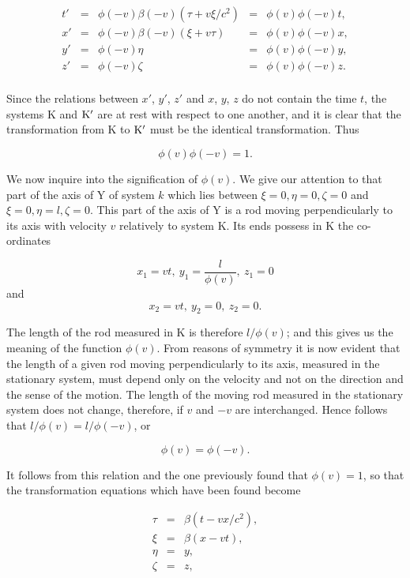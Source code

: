\documentclass{article}
\newcommand{\pr}[1]{${\rm #1}'$}
\begin{document}
\[
\begin{array}{lllll}
t' & = & \phi(-v)\beta(-v)(\tau+v\xi/c^2) & = &\phi(v)\phi(-v)t,\\
x' & = & \phi(-v)\beta(-v)(\xi+v\tau) & = & \phi(v)\phi(-v)x,\\
y' & = & \phi(-v)\eta & = & \phi(v)\phi(-v)y,\\
z' & = & \phi(-v)\zeta & = & \phi(v)\phi(-v)z.\\
\end{array}
\]

Since the relations between $x'$, $y'$, $z'$ and $x$, $y$, $z$
do not contain the time $t$, the systems K and \pr{K} are at rest
with respect to one another, and it is clear that the
transformation from K to \pr{K} must be the identical
transformation.  Thus

\[
\phi(v)\phi(-v)=1.
\]

\noindent
We now inquire into the signification of $\phi(v)$.  We give our attention
to that part of the axis of Y of system $k$ which lies between
$\xi=0, \eta=0, \zeta=0$ and $\xi=0, \eta=l, \zeta=0$.
This part of the axis of Y is a
rod moving perpendicularly to its axis with velocity $v$ relatively to
system K\@.  Its ends possess in K the co-ordinates

\[
x_1=vt,\ y_1=\frac{l}{\phi(v)},\ z_1=0
\]
and
\[
x_2=vt,\ y_2=0,\ z_2=0.
\]

\noindent
The length of the rod measured in K is therefore $l/\phi(v)$; and this
gives us the meaning of the function $\phi(v)$.  From reasons of symmetry
it is now evident that the length of a given rod moving
perpendicularly to its axis, measured in the stationary system, must
depend only on the velocity and not on the direction and the sense of
the motion.  The length of the moving rod measured in the stationary
system does not change, therefore, if $v$ and $-v$ are interchanged.
Hence follows that $l/\phi(v)=l/\phi(-v)$, or

\[
\phi(v)=\phi(-v).
\]

\noindent
It follows from this relation and the one previously found that
$\phi(v)=1$,
so that the transformation equations which have been found become

\begin{eqnarray*}
\tau & = & \beta(t-vx/c^2), \\
\xi  & = & \beta(x - vt), \\
\eta & = & y, \\
\zeta & = & z, \\
\end{eqnarray*}
\end{document}
